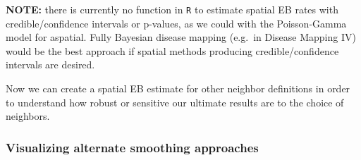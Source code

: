 \documentclass[
]{book}
\newenvironment{Shaded}{\begin{snugshade}}{\end{snugshade}}
\newcommand{\AttributeTok}[1]{\textcolor[rgb]{0.13,0.29,0.53}{#1}}
\newcommand{\CommentTok}[1]{\textcolor[rgb]{0.56,0.35,0.01}{\textit{#1}}}
\newcommand{\DecValTok}[1]{\textcolor[rgb]{0.00,0.00,0.81}{#1}}
\newcommand{\FunctionTok}[1]{\textcolor[rgb]{0.13,0.29,0.53}{\textbf{#1}}}
\newcommand{\NormalTok}[1]{#1}
\newcommand{\OtherTok}[1]{\textcolor[rgb]{0.56,0.35,0.01}{#1}}
\newcommand{\SpecialCharTok}[1]{\textcolor[rgb]{0.81,0.36,0.00}{\textbf{#1}}}
\newenvironment{rmdnote}[1]
  {
  \begin{itemize}
  \renewcommand{\labelitemi}{
    \raisebox{-.7\height}[0pt][0pt]{
      {\setkeys{Gin}{width=3em,keepaspectratio}\texttt{[image: images/\#1]}}
    }
  }
  \setlength{\fboxsep}{1em}
  \begin{note}
  \item
  }
  {
  \end{note}
  \end{itemize}
  }
\begin{document}
\begin{rmdnote}{note}
\textbf{NOTE:} there is currently no function in \texttt{R} to estimate spatial EB rates with credible/confidence intervals or p-values, as we could with the Poisson-Gamma model for aspatial. Fully Bayesian disease mapping (e.g.~in Disease Mapping IV) would be the best approach if spatial methods producing credible/confidence intervals are desired.

\end{rmdnote}

Now we can create a spatial EB estimate for other neighbor definitions in order to understand how robust or sensitive our ultimate results are to the choice of neighbors.

\begin{Shaded}
\end{Shaded}

\hypertarget{visualizing-alternate-smoothing-approaches}{%
\subsubsection{Visualizing alternate smoothing approaches}\label{visualizing-alternate-smoothing-approaches}}
\end{document}
